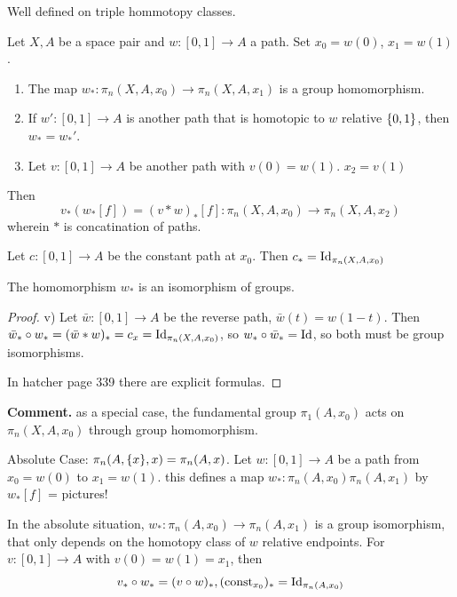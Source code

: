 \documentclass{TemplateLecture}
\begin{document}
Well defined on triple hommotopy classes. 

\begin{proposition}
    Let \(X,A\) be a space pair and \(w\colon [0,1] \to A\) a path. Set \(x_0 = w(0)\), \(x_1 = w(1)\).
    \begin{enumerate}
        \item The map \(w_*\colon \pi_n(X,A,x_0) \to \pi_n(X,A, x_1)\) is a group homomorphism.
        \item If \(w'\colon [0,1] \to A\) is another path that is homotopic to \(w\) relative \(\{0,1\}\), then \(w_* = w_*'\).
        \item Let \(v\colon [0,1] \to A\) be another path with \(v(0) = w(1)\). \(x_2 = v(1)\)
    \end{enumerate}
    Then
    \[v_*(w_*[f]) = (v * w)_*[f] \colon \pi_n(X,A,x_0) \to \pi_n(X,A,x_2)\]
    wherein \(*\) is concatination of paths.

    Let \(c\colon [0,1] \to A\) be the constant path at \(x_0\). Then \(c_* = \mathrm{Id}_{\pi_n(X,A,x_0)}\)

    The homomorphism \(w_*\) is an isomorphism of groups.
\end{proposition}

\begin{proof}
    v) Let \(\bar w\colon [0,1] \to A\) be the reverse path, \(\bar w(t) = w(1-t)\).
    Then \(\bar w_* \circ w_* = (\bar w * w)_* = c_x = \mathrm{Id}_{\pi_n(X,A,x_0)}\), so \(w_* \circ \bar w_* = \mathrm{Id}\), so both must be group isomorphisms.

    In hatcher page 339 there are explicit formulas.
\end{proof}

\textbf{Comment.} as a special case, the fundamental group \(\pi_1(A,x_0)\) acts on \(\pi_n(X,A,x_0)\) through group homomorphism.

Absolute Case: \(\pi_n(A, \{x\}, x) = \pi_n(A,x)\).
Let \(w\colon [0,1] \to A\) be a path from \(x_0 = w(0)\) to \(x_1 = w(1)\). this defines a map \(w_*\colon \pi_n(A,x_0) \pi_n(A,x_1)\) by
\(w_*[f]\) = pictures!

\begin{proposition}
    In the absolute situation, \(w_* \colon \pi_n(A,x_0) \to \pi_n(A, x_1)\) is a group isomorphism, that only depends on the homotopy class of \(w\) relative endpoints. For \(v\colon [0,1] \to A\) with \(v(0) = w(1) = x_1\), then
    \[v_* \circ w_* = (v\circ w)_*, (\mathrm{const}_{x_0})_* = \mathrm{Id}_{\pi_n(A,x_0)}\]
\end{proposition}
\end{document}
